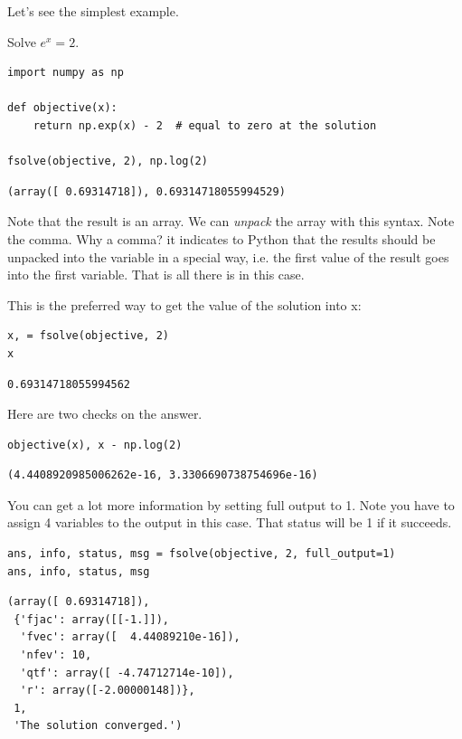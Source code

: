 \documentclass[11pt]{article}
\begin{document}
Let's see the simplest example.

Solve \(e^x = 2\).

\begin{verbatim}
import numpy as np

def objective(x):
    return np.exp(x) - 2  # equal to zero at the solution

fsolve(objective, 2), np.log(2)
\end{verbatim}

\begin{verbatim}
(array([ 0.69314718]), 0.69314718055994529)
\end{verbatim}

Note that the result is an array. We can \emph{unpack} the array with this syntax. Note the comma. Why a comma? it indicates to Python that the results should be unpacked into the variable in a special way, i.e. the first value of the result goes into the first variable. That is all there is in this case.

This is the preferred way to get the value of the solution into x:

\begin{verbatim}
x, = fsolve(objective, 2)
x
\end{verbatim}

\begin{verbatim}
0.69314718055994562
\end{verbatim}

Here are two checks on the answer.

\begin{verbatim}
objective(x), x - np.log(2)
\end{verbatim}

\begin{verbatim}
(4.4408920985006262e-16, 3.3306690738754696e-16)
\end{verbatim}

You can get a lot more information by setting full output to 1. Note you have to assign 4 variables to the output in this case. That status will be 1 if it succeeds.

\begin{verbatim}
ans, info, status, msg = fsolve(objective, 2, full_output=1)
ans, info, status, msg
\end{verbatim}

\begin{verbatim}
(array([ 0.69314718]),
 {'fjac': array([[-1.]]),
  'fvec': array([  4.44089210e-16]),
  'nfev': 10,
  'qtf': array([ -4.74712714e-10]),
  'r': array([-2.00000148])},
 1,
 'The solution converged.')
\end{verbatim}
\end{document}

